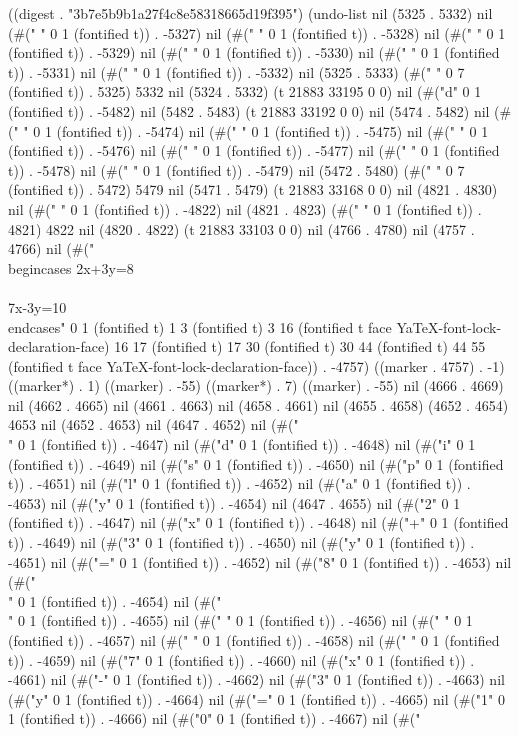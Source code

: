 
((digest . "3b7e5b9b1a27f4c8e58318665d19f395") (undo-list nil (5325 . 5332) nil (#(" " 0 1 (fontified t)) . -5327) nil (#(" " 0 1 (fontified t)) . -5328) nil (#(" " 0 1 (fontified t)) . -5329) nil (#(" " 0 1 (fontified t)) . -5330) nil (#(" " 0 1 (fontified t)) . -5331) nil (#(" " 0 1 (fontified t)) . -5332) nil (5325 . 5333) (#("       " 0 7 (fontified t)) . 5325) 5332 nil (5324 . 5332) (t 21883 33195 0 0) nil (#("d" 0 1 (fontified t)) . -5482) nil (5482 . 5483) (t 21883 33192 0 0) nil (5474 . 5482) nil (#(" " 0 1 (fontified t)) . -5474) nil (#(" " 0 1 (fontified t)) . -5475) nil (#(" " 0 1 (fontified t)) . -5476) nil (#(" " 0 1 (fontified t)) . -5477) nil (#(" " 0 1 (fontified t)) . -5478) nil (#(" " 0 1 (fontified t)) . -5479) nil (5472 . 5480) (#("       " 0 7 (fontified t)) . 5472) 5479 nil (5471 . 5479) (t 21883 33168 0 0) nil (4821 . 4830) nil (#("	" 0 1 (fontified t)) . -4822) nil (4821 . 4823) (#("	" 0 1 (fontified t)) . 4821) 4822 nil (4820 . 4822) (t 21883 33103 0 0) nil (4766 . 4780) nil (4757 . 4766) nil (#("
		\\begin{cases}
		 2x+3y=8\\\\
		 7x-3y=10
		\\end{cases}" 0 1 (fontified t) 1 3 (fontified t) 3 16 (fontified t face YaTeX-font-lock-declaration-face) 16 17 (fontified t) 17 30 (fontified t) 30 44 (fontified t) 44 55 (fontified t face YaTeX-font-lock-declaration-face)) . -4757) ((marker . 4757) . -1) ((marker*) . 1) ((marker) . -55) ((marker*) . 7) ((marker) . -55) nil (4666 . 4669) nil (4662 . 4665) nil (4661 . 4663) nil (4658 . 4661) nil (4655 . 4658) (4652 . 4654) 4653 nil (4652 . 4653) nil (4647 . 4652) nil (#("\\" 0 1 (fontified t)) . -4647) nil (#("d" 0 1 (fontified t)) . -4648) nil (#("i" 0 1 (fontified t)) . -4649) nil (#("s" 0 1 (fontified t)) . -4650) nil (#("p" 0 1 (fontified t)) . -4651) nil (#("l" 0 1 (fontified t)) . -4652) nil (#("a" 0 1 (fontified t)) . -4653) nil (#("y" 0 1 (fontified t)) . -4654) nil (4647 . 4655) nil (#("2" 0 1 (fontified t)) . -4647) nil (#("x" 0 1 (fontified t)) . -4648) nil (#("+" 0 1 (fontified t)) . -4649) nil (#("3" 0 1 (fontified t)) . -4650) nil (#("y" 0 1 (fontified t)) . -4651) nil (#("=" 0 1 (fontified t)) . -4652) nil (#("8" 0 1 (fontified t)) . -4653) nil (#("\\" 0 1 (fontified t)) . -4654) nil (#("\\" 0 1 (fontified t)) . -4655) nil (#("
" 0 1 (fontified t)) . -4656) nil (#("	" 0 1 (fontified t)) . -4657) nil (#("	" 0 1 (fontified t)) . -4658) nil (#(" " 0 1 (fontified t)) . -4659) nil (#("7" 0 1 (fontified t)) . -4660) nil (#("x" 0 1 (fontified t)) . -4661) nil (#("-" 0 1 (fontified t)) . -4662) nil (#("3" 0 1 (fontified t)) . -4663) nil (#("y" 0 1 (fontified t)) . -4664) nil (#("=" 0 1 (fontified t)) . -4665) nil (#("1" 0 1 (fontified t)) . -4666) nil (#("0" 0 1 (fontified t)) . -4667) nil (#("
